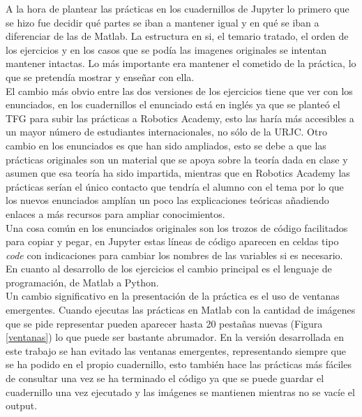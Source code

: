 A la hora de plantear las prácticas en los cuadernillos de Jupyter lo primero que se hizo fue decidir qué partes se iban a mantener igual y en qué se iban a diferenciar de las de Matlab. La estructura en si, el temario tratado, el orden de los ejercicios y en los casos que se podía las imagenes originales se intentan mantener intactas. Lo más importante era mantener el cometido de la práctica, lo que se pretendía mostrar y enseñar con ella.\\

El cambio más obvio entre las dos versiones de los ejercicios tiene que ver con los enunciados, en los cuadernillos el enunciado está en inglés ya que se planteó el TFG para subir las prácticas a Robotics Academy, esto las haría más accesibles a un mayor número de estudiantes internacionales, no sólo de la URJC. Otro cambio en los enunciados es que han sido ampliados, esto se debe a que las prácticas originales son un material que se apoya sobre la teoría dada en clase y asumen que esa teoría ha sido impartida, mientras que en Robotics Academy las prácticas serían el único contacto que tendría el alumno con el tema por lo que los nuevos enunciados amplían un poco las explicaciones teóricas añadiendo enlaces a más recursos para ampliar conocimientos.\\

Una cosa común en los enunciados originales son los trozos de código facilitados para copiar y pegar, en Jupyter estas líneas de código aparecen en celdas tipo \emph{code} con indicaciones para cambiar los nombres de las variables si es necesario.\\

En cuanto al desarrollo de los ejercicios el cambio principal es el lenguaje de programación, de Matlab a Python. \\

Un cambio significativo en la presentación de la práctica es el uso de ventanas emergentes. Cuando ejecutas las prácticas en Matlab con la cantidad de imágenes que se pide representar pueden aparecer hasta 20 pestañas nuevas  (Figura \ref{ventanas}) lo que puede ser bastante abrumador. En la versión desarrollada en este trabajo se han evitado las ventanas emergentes, representando siempre que se ha podido en el propio cuadernillo, esto también hace las prácticas más fáciles de consultar una vez se ha terminado el código ya que se puede guardar el cuadernillo una vez ejecutado y las imágenes se mantienen mientras no se vacíe el output.\\

